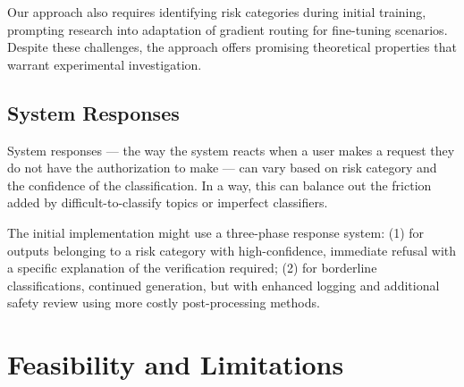 \documentclass{article}
\theoremstyle{plain}
\theoremstyle{definition}
\theoremstyle{remark}
\begin{document}
Our approach also requires identifying risk categories during initial training, prompting research into adaptation of gradient routing for fine-tuning scenarios.
Despite these challenges, the approach offers promising theoretical properties that warrant experimental investigation.

\subsection{System Responses} \label{section:system-responses}

System responses --- the way the system reacts when a user makes a request they do not have the authorization to make --- can vary based on risk category and the confidence of the classification.
In a way, this can balance out the friction added by difficult-to-classify topics or imperfect classifiers.

The initial implementation might use a three-phase response system:
(1) for outputs belonging to a risk category with high-confidence, immediate refusal with a specific explanation of the verification required;
(2) for borderline classifications, continued generation, but with enhanced logging and additional safety review using more costly post-processing methods.

\section{Feasibility and Limitations}
\label{section:feasibility-and-limitations}

\end{document}
